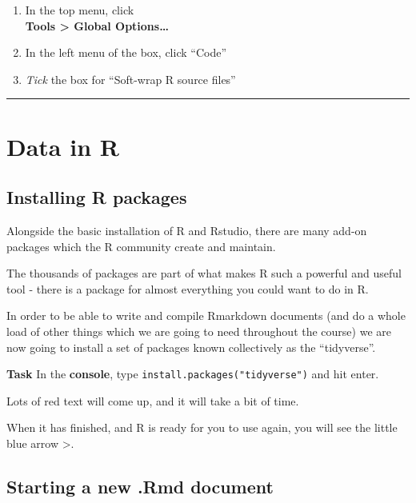 \documentclass[]{book}
\providecommand{\tightlist}{%
  \setlength{\itemsep}{0pt}\setlength{\parskip}{0pt}}
\begin{document}
\begin{enumerate}
\def\labelenumi{\arabic{enumi}.}
\tightlist
\item
  In the top menu, click\\
  \textbf{Tools \textgreater{} Global Options\ldots{}}
\item
  In the left menu of the box, click ``Code''
\item
  \emph{Tick} the box for ``Soft-wrap R source files''
\end{enumerate}

\begin{center}\rule{0.5\linewidth}{0.5pt}\end{center}

\hypertarget{data-in-r}{%
\section{Data in R}\label{data-in-r}}

\hypertarget{installing-r-packages}{%
\subsection*{Installing R packages}\label{installing-r-packages}}

Alongside the basic installation of R and Rstudio, there are many add-on packages which the R community create and maintain.

The thousands of packages are part of what makes R such a powerful and useful tool - there is a package for almost everything you could want to do in R.

In order to be able to write and compile Rmarkdown documents (and do a whole load of other things which we are going to need throughout the course) we are now going to install a set of packages known collectively as the ``tidyverse''.

\textbf{Task}
In the \textbf{console}, type \texttt{install.packages("tidyverse")} and hit enter.

Lots of red text will come up, and it will take a bit of time.

When it has finished, and R is ready for you to use again, you will see the little blue arrow {\textgreater{}}.

\hypertarget{starting-a-new-.rmd-document}{%
\subsection*{Starting a new .Rmd document}\label{starting-a-new-.rmd-document}}
\end{document}
